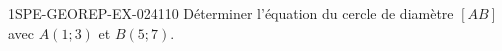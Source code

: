 \begin{exercice}{1SPE-GEOREP-EX-024}{1}{10}
Déterminer l'équation du cercle de diamètre $[AB]$ avec $A(1 ; 3)$ et $B(5 ; 7)$.
\end{exercice}

